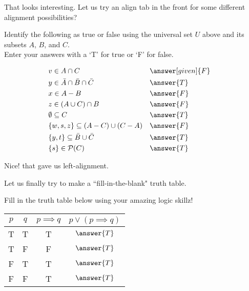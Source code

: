 \documentclass{ximera}
\begin{document}
That looks interesting. Let us try an align tab in the front for some different alignment possibilities?

\begin{question}
Identify the following as true or false using the universal set $U$ above and its subsets $A$, $B$, and $C$. \\ Enter your answers with a `T' for true or `F' for false.
\begin{prompt}

    \begin{align*}
        &v \in A \cap C && \answer[given]{F}  \\
        &y \in \bar{A} \cap \bar{B} \cap \bar{C} && \answer{T} \\		
        &x \in A - B && \answer{F}  \\		
        &z \in (A \cup C) \cap B && \answer{F} \\	
        &\emptyset \subseteq C && \answer{T} \\	
        &\{w, s, z\} \subseteq (A - C) \cup (C - A) && \answer{F}&\\
        &\{y,t\} \subseteq \bar{B} \cup \bar{C} && \answer{T} \\			
        &\{s\} \in \mathcal{P}(C) && \answer{T} 
    \end{align*}

\end{prompt}
\end{question}

Nice! that gave us left-alignment. 

Let us finally try to make a ``fill-in-the-blank" truth table.

\begin{problem}
Fill in the truth table below using your amazing logic skillz!

\begin{prompt}
\begin{center}
\begin{tabular}{c | c | c | c }
		$p$ & $q$ & $p \implies q$ & $p \vee (p \implies q)$ \\
		\hline
		T & T & T & $\answer{T}$ \\
		T & F & F & $\answer{T}$ \\
		F & T & T & $\answer{T}$\\
		F & F & T & $\answer{T}$
	\end{tabular}
\end{center}
\end{prompt}
\end{problem}
\end{document}
